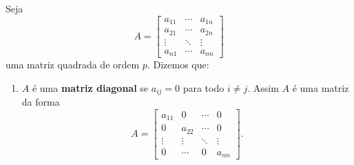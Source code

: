 \begin{definicao}
    Seja
    \[
        A = \begin{bmatrix}
                a_{11} & \cdots & a_{1n}\\
                a_{21} & \cdots & a_{2n}\\
                \vdots & \ddots & \vdots\\
                a_{n1} & \cdots & a_{nn}
            \end{bmatrix}
    \]
    uma matriz quadrada de ordem $p$. Dizemos que:
    \begin{enumerate}[label={\roman*})]
        \item $A$ é uma \textbf{matriz diagonal} se $a_{ij} = 0$ para todo $i \ne j$. Assim $A$ é uma matriz da forma
            \[
                A = \begin{bmatrix}
                    a_{11} & 0 & \cdots & 0\\
                    0 & a_{22} & \cdots & 0\\
                    \vdots & \vdots & \ddots & \vdots\\
                    0 & \cdots & 0 & a_{nn}
                \end{bmatrix}.
            \]


\end{enumerate}
\end{definicao}

